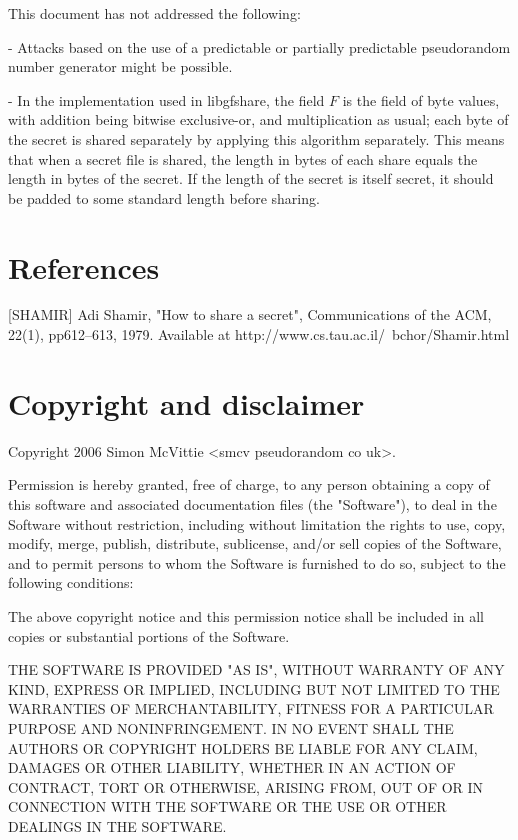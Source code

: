 \documentclass[]{article}
\begin{document}
This document has not addressed the following:

- Attacks based on the use of a predictable or partially predictable
  pseudorandom number generator might be possible.

- In the implementation used in libgfshare, the field $F$ is the field
  of byte values, with addition being bitwise exclusive-or, and multiplication
  as usual; each byte of the secret is shared separately by applying this
  algorithm separately. This means that when a secret file is shared,
  the length in bytes of each share equals the length in bytes of the
  secret. If the length of the secret is itself secret, it should be
  padded to some standard length before sharing.

\section{References}

[SHAMIR] Adi Shamir, "How to share a secret", Communications of the ACM, 22(1), pp612–613, 1979. Available at http://www.cs.tau.ac.il/~bchor/Shamir.html

\section{Copyright and disclaimer}

Copyright 2006 Simon McVittie <smcv pseudorandom co uk>.

Permission is hereby granted, free of charge, to any person obtaining a copy
of this software and associated documentation files (the "Software"), to deal
in the Software without restriction, including without limitation the rights
to use, copy, modify, merge, publish, distribute, sublicense, and/or sell
copies of the Software, and to permit persons to whom the Software is
furnished to do so, subject to the following conditions:

The above copyright notice and this permission notice shall be included in
all copies or substantial portions of the Software.

THE SOFTWARE IS PROVIDED "AS IS", WITHOUT WARRANTY OF ANY KIND, EXPRESS OR
IMPLIED, INCLUDING BUT NOT LIMITED TO THE WARRANTIES OF MERCHANTABILITY,
FITNESS FOR A PARTICULAR PURPOSE AND NONINFRINGEMENT.  IN NO EVENT SHALL THE
AUTHORS OR COPYRIGHT HOLDERS BE LIABLE FOR ANY CLAIM, DAMAGES OR OTHER
LIABILITY, WHETHER IN AN ACTION OF CONTRACT, TORT OR OTHERWISE, ARISING FROM,
OUT OF OR IN CONNECTION WITH THE SOFTWARE OR THE USE OR OTHER DEALINGS IN
THE SOFTWARE.
\end{document}
